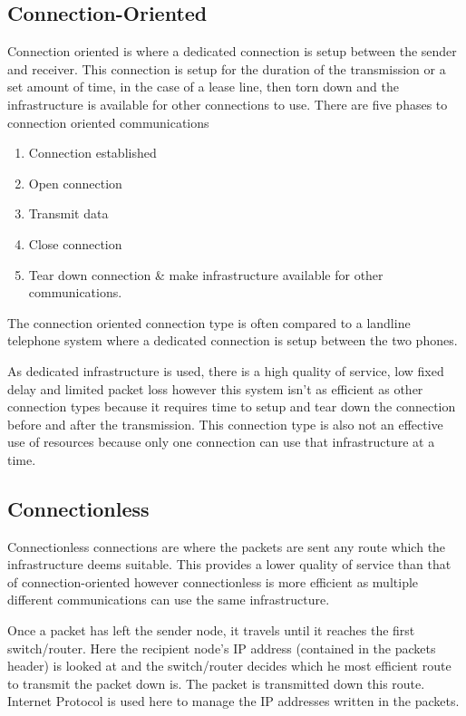 \subsection*{Connection-Oriented}
Connection oriented is where a dedicated connection is setup between the sender and receiver. This connection is setup for the duration of the transmission or a set amount of time, in the case of a lease line, then torn down and the infrastructure is available for other connections to use. There are five phases to connection oriented communications
\begin{enumerate}
    \item Connection established
    \item Open connection
    \item Transmit data
    \item Close connection
    \item Tear down connection \& make infrastructure available for other communications.
\end{enumerate}
The connection oriented connection type is often compared to a landline telephone system where a dedicated connection is setup between the two phones.

As dedicated infrastructure is used, there is a high quality of service, low fixed delay and limited packet loss however this system isn't as efficient as other connection types because it requires time to setup and tear down the connection before and after the transmission. This connection type is also not an effective use of resources because only one connection can use that infrastructure at a time.

\subsection*{Connectionless}
Connectionless connections are where the packets are sent any route which the infrastructure deems suitable. This provides a lower quality of service than that of connection-oriented however connectionless is more efficient as multiple different communications can use the same infrastructure. 

Once a packet has left the sender node, it travels until it reaches the first switch/router. Here the recipient node's IP address (contained in the packets header) is looked at and the switch/router decides which he most efficient route to transmit the packet down is. The packet is transmitted down this route. Internet Protocol is used here to manage the IP addresses written in the packets. 

